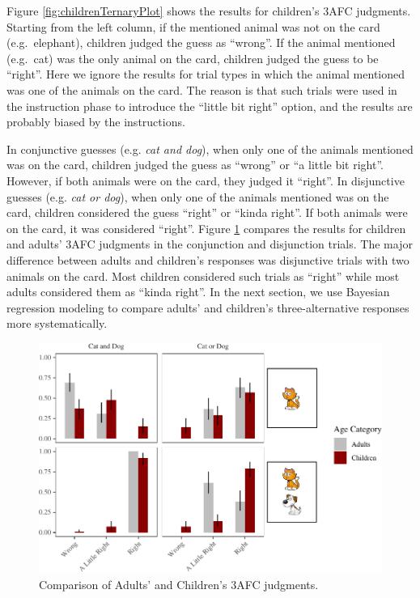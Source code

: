 \documentclass[floatsintext,man]{apa6}
\theoremstyle{definition}
\theoremstyle{definition}
\theoremstyle{definition}
\theoremstyle{remark}
\begin{document}
Figure \ref{fig:childrenTernaryPlot} shows the results for children's
3AFC judgments. Starting from the left column, if the mentioned animal
was not on the card (e.g.~elephant), children judged the guess as
\enquote{wrong}. If the animal mentioned (e.g.~cat) was the only animal
on the card, children judged the guess to be \enquote{right}. Here we
ignore the results for trial types in which the animal mentioned was one
of the animals on the card. The reason is that such trials were used in
the instruction phase to introduce the \enquote{little bit right}
option, and the results are probably biased by the instructions.

In conjunctive guesses (e.g. \emph{cat and dog}), when only one of the
animals mentioned was on the card, children judged the guess as
\enquote{wrong} or \enquote{a little bit right}. However, if both
animals were on the card, they judged it \enquote{right}. In disjunctive
guesses (e.g. \emph{cat or dog}), when only one of the animals mentioned
was on the card, children considered the guess \enquote{right} or
\enquote{kinda right}. If both animals were on the card, it was
considered \enquote{right}. Figure \ref{fig:childAdultComp} compares the
results for children and adults' 3AFC judgments in the conjunction and
disjunction trials. The major difference between adults and children's
responses was disjunctive trials with two animals on the card. Most
children considered such trials as \enquote{right} while most adults
considered them as \enquote{kinda right}. In the next section, we use
Bayesian regression modeling to compare adults' and children's
three-alternative responses more systematically.

\begin{figure}
\centering
\includegraphics{figs/childAdultComp-1.pdf}
\caption{\label{fig:childAdultComp}Comparison of Adults' and Children's 3AFC
judgments.}
\end{figure}
\end{document}
